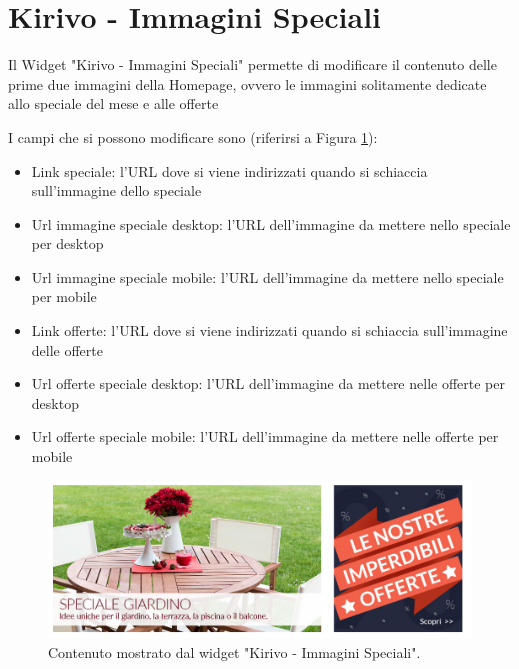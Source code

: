 




\newpage


\section{Kirivo - Immagini Speciali}

Il Widget "Kirivo - Immagini Speciali" permette di modificare il contenuto
delle prime due immagini della Homepage, ovvero le immagini solitamente dedicate
allo speciale del mese e alle offerte 

I campi che si possono modificare sono (riferirsi a Figura \ref{fig:kspec}):
\begin{itemize}
\item Link speciale: l'URL dove si viene indirizzati quando si schiaccia sull'immagine dello speciale
\item Url immagine speciale desktop: l'URL dell'immagine da mettere nello speciale per desktop
\item Url immagine speciale mobile: l'URL dell'immagine da mettere nello speciale per mobile
\item Link offerte: l'URL dove si viene indirizzati quando si schiaccia sull'immagine delle offerte
\item Url offerte speciale desktop: l'URL dell'immagine da mettere nelle offerte per desktop
\item Url offerte speciale mobile: l'URL dell'immagine da mettere nelle offerte per mobile
\end{itemize}

\begin{figure}
  \includegraphics[width=\textwidth]{figure/kspec.png}
  \caption{Contenuto mostrato dal widget "Kirivo - Immagini Speciali".}
  \label{fig:kspec}
\end{figure}

